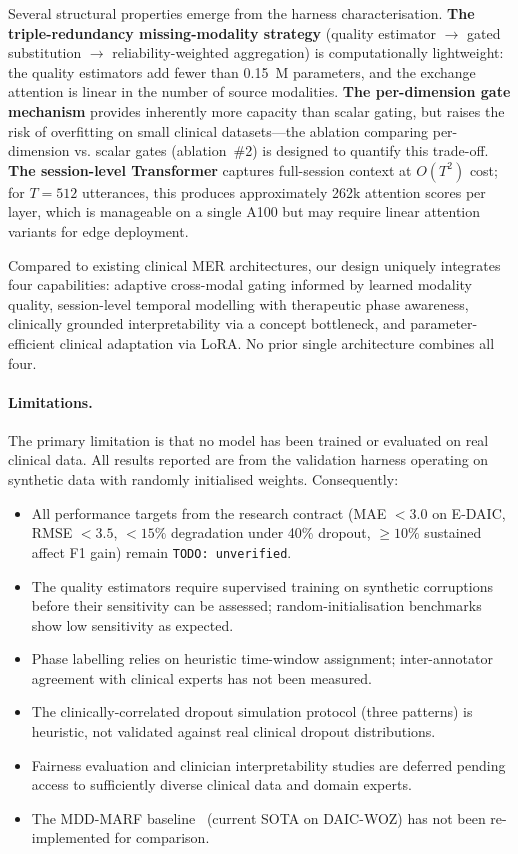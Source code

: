 \documentclass{article}
\begin{document}
Several structural properties emerge from the harness characterisation. \textbf{The
triple-redundancy missing-modality strategy} (quality estimator $\to$ gated substitution
$\to$ reliability-weighted aggregation) is computationally lightweight: the quality
estimators add fewer than 0.15~M parameters, and the exchange attention is linear in
the number of source modalities. \textbf{The per-dimension gate mechanism} provides
inherently more capacity than scalar gating, but raises the risk of overfitting on
small clinical datasets---the ablation comparing per-dimension vs. scalar gates
(ablation~\#2) is designed to quantify this trade-off. \textbf{The session-level
Transformer} captures full-session context at $O(T^2)$ cost; for $T = 512$ utterances,
this produces approximately 262k attention scores per layer, which is manageable on a
single A100 but may require linear attention variants for edge deployment.

Compared to existing clinical MER architectures, our design uniquely integrates four
capabilities: adaptive cross-modal gating informed by learned modality quality,
session-level temporal modelling with therapeutic phase awareness, clinically grounded
interpretability via a concept bottleneck, and parameter-efficient clinical adaptation
via LoRA. No prior single architecture combines all four.

\paragraph{Limitations.}
The primary limitation is that no model has been trained or evaluated on real clinical
data. All results reported are from the validation harness operating on synthetic data
with randomly initialised weights. Consequently:

\begin{itemize}
  \item All performance targets from the research contract (MAE $< 3.0$ on E-DAIC,
        RMSE $< 3.5$, $<15\%$ degradation under 40\% dropout, $\geq 10\%$ sustained
        affect F1 gain) remain \texttt{TODO: unverified}.
  \item The quality estimators require supervised training on synthetic corruptions
        before their sensitivity can be assessed; random-initialisation benchmarks
        show low sensitivity as expected.
  \item Phase labelling relies on heuristic time-window assignment; inter-annotator
        agreement with clinical experts has not been measured.
  \item The clinically-correlated dropout simulation protocol (three patterns) is
        heuristic, not validated against real clinical dropout distributions.
  \item Fairness evaluation and clinician interpretability studies are deferred pending
        access to sufficiently diverse clinical data and domain experts.
  \item The MDD-MARF baseline~\cite{zhou2025mddmarf} (current SOTA on DAIC-WOZ) has
        not been re-implemented for comparison.
\end{itemize}
\end{document}
